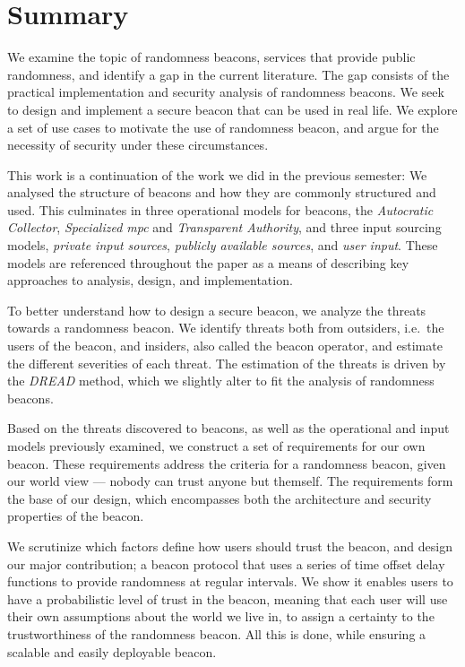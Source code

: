\section*{Summary}
We examine the topic of randomness beacons, services that provide public randomness, and identify a gap in the current literature.
The gap consists of the practical implementation and security analysis of randomness beacons.
We seek to design and implement a secure beacon that can be used in real life.
We explore a set of use cases to motivate the use of randomness beacon, and argue for the necessity of security under these circumstances.

This work is a continuation of the work we did in the previous semester: We analysed the structure of beacons and how they are commonly structured and used.
This culminates in three operational models for beacons, the \emph{Autocratic Collector}, \emph{Specialized \acrshort{mpc}} and \emph{Transparent Authority}, and three input sourcing models, \emph{private input sources}, \emph{publicly available sources}, and \emph{user input}.
These models are referenced throughout the paper as a means of describing key approaches to analysis, design, and implementation.

\bigskip\noindent
To better understand how to design a secure beacon, we analyze the threats towards a randomness beacon.
We identify threats both from outsiders, i.e.\ the users of the beacon, and insiders, also called the beacon operator, and estimate the different severities of each threat.
The estimation of the threats is driven by the \emph{DREAD} method, which we slightly alter to fit the analysis of randomness beacons.

Based on the threats discovered to beacons, as well as the operational and input models previously examined, we construct a set of requirements for our own beacon.
These requirements address the criteria for a randomness beacon, given our world view --- nobody can trust anyone but themself.
The requirements form the base of our design, which encompasses both the architecture and security properties of the beacon.

\bigskip\noindent
We scrutinize which factors define how users should trust the beacon, and design our major contribution; a beacon protocol that uses a series of time offset delay functions to provide randomness at regular intervals.
We show it enables users to have a probabilistic level of trust in the beacon, meaning that each user will use their own assumptions about the world we live in, to assign a certainty to the trustworthiness of the randomness beacon.
All this is done, while ensuring a scalable and easily deployable beacon.

